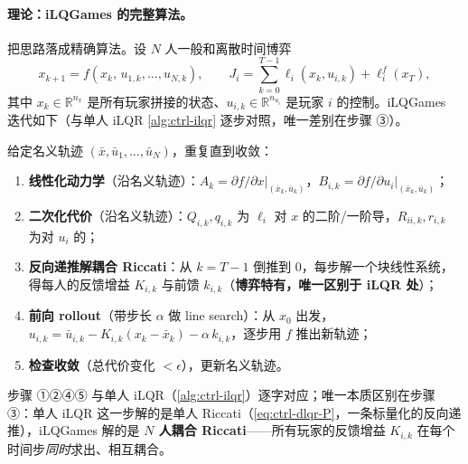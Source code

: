 \paragraph{理论：iLQGames 的完整算法。}
把思路落成精确算法。设 $N$ 人一般和离散时间博弈
\begin{equation}
  x_{k+1}=f(x_k,\,u_{1,k},\dots,u_{N,k}),\qquad
  J_i=\sum_{k=0}^{T-1}\ell_i(x_k,u_{i,k})+\ell_i^f(x_T),
  \label{eq:rtg-ilqgames-problem}
\end{equation}
其中 $x_k\in\mathbb{R}^{n_x}$ 是所有玩家拼接的状态、$u_{i,k}\in\mathbb{R}^{n_{u_i}}$ 是玩家 $i$ 的控制。iLQGames 迭代如下（与单人 iLQR \cref{alg:ctrl-ilqr} 逐步对照，唯一差别在步骤 ③）。

\begin{algo}\label{alg:rtg-ilqgames}
给定名义轨迹 $(\bar x,\bar u_1,\dots,\bar u_N)$，重复直到收敛：
\begin{enumerate}
  \item \textbf{线性化动力学}（沿名义轨迹）：$A_k=\partial f/\partial x|_{(\bar x_k,\bar u_k)}$，$B_{i,k}=\partial f/\partial u_i|_{(\bar x_k,\bar u_k)}$；
  \item \textbf{二次化代价}（沿名义轨迹）：$Q_{i,k},q_{i,k}$ 为 $\ell_i$ 对 $x$ 的二阶/一阶导，$R_{ii,k},r_{i,k}$ 为对 $u_i$ 的；
  \item \textbf{反向递推解耦合 Riccati}：从 $k=T-1$ 倒推到 $0$，每步解一个块线性系统，得每人的反馈增益 $K_{i,k}$ 与前馈 $k_{i,k}$（\textbf{博弈特有，唯一区别于 iLQR 处}）；
  \item \textbf{前向 rollout}（带步长 $\alpha$ 做 line search）：从 $x_0$ 出发，$u_{i,k}=\bar u_{i,k}-K_{i,k}(x_k-\bar x_k)-\alpha\,k_{i,k}$，逐步用 $f$ 推出新轨迹；
  \item \textbf{检查收敛}（总代价变化 $<\epsilon$），更新名义轨迹。
\end{enumerate}
\end{algo}

\noindent 步骤 ①②④⑤ 与单人 iLQR（\cref{alg:ctrl-ilqr}）逐字对应；唯一本质区别在步骤 ③：单人 iLQR 这一步解的是单人 Riccati（\cref{eq:ctrl-dlqr-P}，一条标量化的反向递推），iLQGames 解的是 \textbf{$N$ 人耦合 Riccati}——所有玩家的反馈增益 $K_{i,k}$ 在每个时间步\emph{同时}求出、相互耦合。

